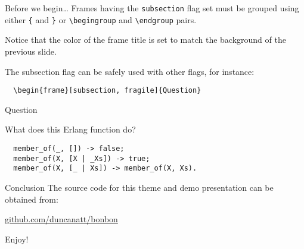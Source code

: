 \documentclass{beamer} %
\begin{document}
{
\begin{frame}{Before we begin\ldots}
  Frames having the \texttt{subsection} flag set must be grouped
  using either \texttt{\{} and \texttt{\}} or \texttt{\textbackslash{begingroup}}
  and \texttt{\textbackslash{endgroup}} pairs.

  \bigskip
  Notice that the color of the frame title is set to match the background of
  the previous slide.

  \bigskip
  The subsection flag can be safely used with other flags, for instance:
  \begin{verbatim}  \begin{frame}[subsection, fragile]{Question}\end{verbatim}
\end{frame}

\begin{frame}{Question}
  \begin{block}{What does this Erlang function do?}
  \begin{lstlisting}
  member_of(_, []) -> false;
  member_of(X, [X | _Xs]) -> true;
  member_of(X, [_ | Xs]) -> member_of(X, Xs).
  \end{lstlisting}
  \end{block}

  \bigskip
\end{frame}
}

\begin{frame}{Conclusion}
  The source code for this theme and demo presentation can be obtained from:
  \begin{center}\href{http://github.com/duncanatt/bonbon}{github.com/duncanatt/bonbon}\end{center}
  Enjoy!
\end{frame}
\end{document}
